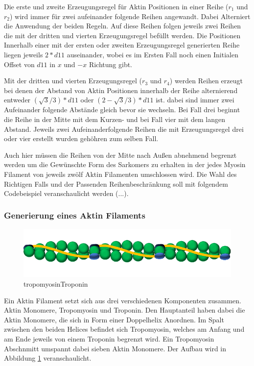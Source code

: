 \documentclass[a4paper,m]{cgBA}
\begin{document}
Die erste und zweite Erzeugungsregel für Aktin Positionen in einer Reihe (\(r_1\) und \(r_2\)) wird immer für zwei aufeinander folgende Reihen angewandt. Dabei Alterniert die Anwendung der beiden Regeln. Auf diese Reihen folgen jeweils zwei Reihen die mit der dritten und vierten Erzeugungsregel befüllt werden. 
Die Positionen Innerhalb einer mit der ersten oder zweiten Erzeugungsregel generierten Reihe liegen jeweils \(2 * d11\) auseinander, wobei es im Ersten Fall noch einen Initialen Offset von \(d11\) in \(x\) und \(-x\) Richtung gibt.

Mit der dritten und vierten Erzeugungsregel (\(r_3\) und \(r_4\)) werden Reihen erzeugt bei denen der Abstand von Aktin Positionen innerhalb der Reihe alternierend entweder \((\sqrt{3} / 3) * d11\) oder \((2 - \sqrt{3} / 3) * d11\) ist. dabei sind immer zwei Aufeinander folgende Abstände gleich bevor sie wechseln. Bei Fall drei beginnt die Reihe in der Mitte mit dem Kurzen- und bei Fall vier mit dem langen Abstand. Jeweils zwei Aufeinanderfolgende Reihen die mit Erzeugungsregel drei oder vier erstellt wurden gehöhren zum selben Fall.

Auch hier müssen die Reihen von der Mitte nach Außen abnehmend begrenzt werden um die Gewünschte Form des Sarkomers zu erhalten in der jedes Myosin Filament von jeweils zwölf Aktin Filamenten umschlossen wird.
Die Wahl des Richtigen Falls und der Passenden Reihenbeschränkung soll mit folgendem Codebeispiel veranschaulicht werden (...).

\subsubsection{Generierung eines Aktin Filaments}

\begin{figure}[h]
\center
\includegraphics[width=1\textwidth]{Graphics/tropomyosinTroponin.pdf}
\caption{tropomyosinTroponin}
\label{fig:tropomyosinTroponin}
\end{figure}


Ein Aktin Filament setzt sich aus drei verschiedenen Komponenten zusammen. Aktin Monomere, Tropomyosin und Troponin. Den Hauptanteil haben dabei die Aktin Monomere, die sich in Form einer Doppelhelix Anordnen. Im Spalt zwischen den beiden Helices befindet sich Tropomyosin, welches am Anfang und am Ende jeweils von einem Troponin begrenzt wird. Ein Tropomyosin Abschnmitt umspannt dabei sieben Aktin Monomere. Der Aufbau wird in Abbildung  \ref{fig:tropomyosinTroponin} veranschaulicht.
\end{document}
